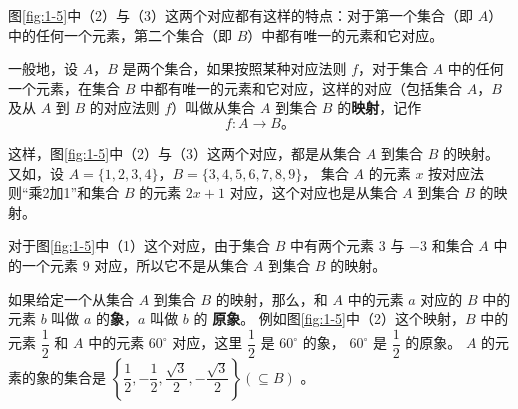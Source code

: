 图\ref{fig:1-5}中（2）与（3）这两个对应都有这样的特点：对于第一个集合（即 $A$）中的任何一个元素，第二个集合（即 $B$）中都有唯一的元素和它对应。

一般地，设 $A$，$B$ 是两个集合，如果按照某种对应法则 $f$，对于集合 $A$ 中的任何一个元素，在集合 $B$ 中都有唯一的元素和它对应，这样的对应（包括集合 $A$，$B$ 及从 $A$ 到 $B$ 的对应法则 $f$）叫做从集合 $A$ 到集合 $B$ 的\textbf{映射}，记作
$$f: A \to B\text{。}$$

这样，图\ref{fig:1-5}中（2）与（3）这两个对应，都是从集合 $A$ 到集合 $B$ 的映射。又如，设 $A=\{1,2,3,4\}$，$B=\{3,4,5,6,7,8,9\}$，
集合 $A$ 的元素 $x$ 按对应法则“乘2加1”和集合 $B$ 的元素 $2x+1$ 对应，这个对应也是从集合 $A$ 到集合 $B$ 的映射。

对于图\ref{fig:1-5}中（1）这个对应，由于集合 $B$ 中有两个元素 $3$ 与 $-3$ 和集合 $A$ 中的一个元素 $9$ 对应，所以它不是从集合 $A$ 到集合 $B$ 的映射。

如果给定一个从集合 $A$ 到集合 $B$ 的映射，那么，和 $A$ 中的元素 $a$ 对应的 $B$ 中的元素 $b$ 叫做 $a$ 的\textbf{象}，$a$ 叫做 $b$ 的 \textbf{原象}。
例如图\ref{fig:1-5}中（2）这个映射，$B$ 中的元素 $\dfrac{1}{2}$ 和 $A$ 中的元素 $60^\circ$ 对应，这里  $\dfrac{1}{2}$ 是 $60^\circ$ 的象， $60^\circ$ 是 $\dfrac{1}{2}$ 的原象。
$A$ 的元素的象的集合是 $\left\{ \dfrac{1}{2}, -\dfrac{1}{2}, \dfrac{\sqrt{3}}{2}, -\dfrac{\sqrt{3}}{2} \right\} ( \subseteq B)$ 。

\lianxi

\begin{xiaotis}


\begin{xiaoxiaotis}
    




\end{xiaoxiaotis}





\end{xiaotis}
